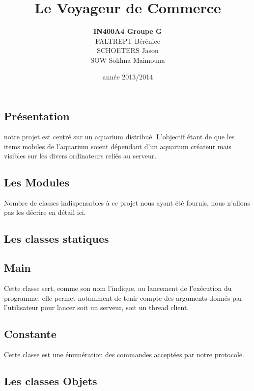 \documentclass[a4paper, 12pt]{report}
\title{Le Voyageur de Commerce}
\author{\textbf{IN400A4 Groupe G}\\ FALTREPT Bérénice \\ SCHOETERS Jason \\ SOW Sokhna Maimouna}
\date{année 2013/2014}
\begin{document}
	\begin{spacing}{1.3}
\maketitle%
\tableofcontents
\newpage
\textcolor{colortitre1}{\section*{Présentation}} 

notre projet est centré sur un aquarium distribué. L'objectif étant de que les items mobiles de l'aquarium soient dépendant d'un aquarium créateur mais visibles sur les divers ordinateurs reliés au serveur.

\textcolor{colortitre1}{\subsection*{Les Modules}}  

Nombre de classes indispensables à ce projet nous ayant été fournis, nous n'allons pas les décrire en détail ici.

	\textcolor{colortitre2}{\subsection*{Les classes statiques}}  
	
		\textcolor{colortitre3}{\subsection*{Main}}  
		
Cette classe sert, comme son nom l'indique, au lancement de l'exécution du programme. elle permet notamment de tenir compte des arguments donnés par l'utilisateur pour lancer soit un serveur, soit un thread client.
		
		
		\textcolor{colortitre3}{\subsection*{Constante}}  
Cette classe est une énumération des commandes acceptées par notre protocole.

	\textcolor{colortitre2}{\subsection*{Les classes Objets}}  	


\end{spacing}
\end{document}
